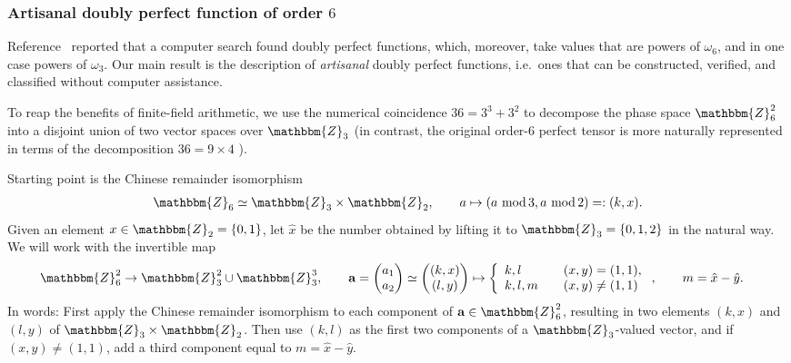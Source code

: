 \documentclass[aps,nofootinbib,floatfix,a4paper]{revtex4}
\newcommand{\1}{\mbox{$\mathbf{1}$}}
\def\ZZ{\mathbbm{Z}}
\renewcommand{\vec}{\mathbf}
\begin{document}
\subsubsection{Artisanal doubly perfect function of order $6$}
\label{sec:artisanal}

Reference~\cite{Rather2024Construction} reported that a computer search found doubly perfect functions, which, moreover, take values that are powers of $\omega_6$, and in one case powers of $\omega_3$.
Our main result is the description of \emph{artisanal} doubly perfect functions,
i.e.\ ones that can be constructed, verified, and classified without computer assistance.

To reap the benefits of finite-field arithmetic, we use the numerical coincidence
$36=3^3 + 3^2$
to decompose the phase space $\ZZ_6^2$ into a disjoint union of two vector spaces over $\ZZ_3$
(in contrast, the original order-$6$ perfect tensor is more naturally represented in terms of the decomposition $36=9\times 4$ \cite{zyczkowski2023understanding}).

Starting point is the Chinese remainder isomorphism 
\begin{align*}
	\ZZ_{6} \simeq \ZZ_3 \times \ZZ_2,
	\qquad
	a \mapsto (a\,\operatorname{mod}3, a\,\operatorname{mod}2) =: (k,x).
\end{align*}
Given an element $x\in\ZZ_2=\{0,1\}$, let $\hat x$ be the number obtained by lifting it to $\ZZ_3=\{0,1,2\}$ in the natural way. 
We will work with the invertible map
\begin{align}\label{eqn:decompose}
	\ZZ_6^2
	\to
	\ZZ_3^2 \cup \ZZ_3^3,
	\qquad	
	\vec a
	=
	\begin{pmatrix}
		a_1\\
		a_2
	\end{pmatrix}
	\simeq
	\begin{pmatrix}
		(k,x)\\
		(l,y)\\
	\end{pmatrix}
	&\mapsto
	\left\{
		\begin{array}{ll}
			k,l & (x,y) = (1,1), \\
			k,l,m\quad & (x,y)\neq (1,1)
		\end{array}
	\right.,
	\qquad
	m= \hat x-\hat y .
\end{align}
In words:
First apply the Chinese remainder isomorphism to each component of $\vec a\in\ZZ_6^2$,
resulting in two elements $(k,x)$ and $(l,y)$ of $\ZZ_3\times \ZZ_2$.
Then use $(k,l)$ as the first two components of a $\ZZ_3$-valued vector, and 
if $(x,y)\neq (1,1)$, add a third component equal to $m=\hat x-\hat y$.
\end{document}
